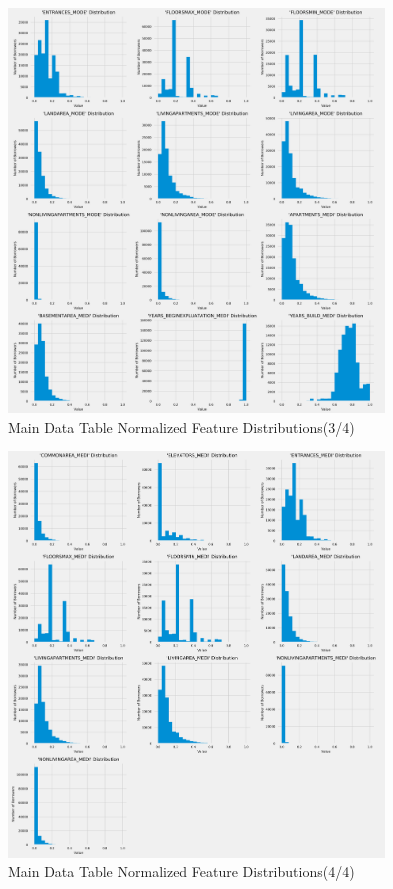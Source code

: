 \documentclass[12pt, letterpaper]{article}
\begin{document}
\begin{appendices}
\pagebreak

\begin{figure}[ht]
\includegraphics[width=0.89\textwidth]{main-data-table-normal-feature-distribs-p3}
\centering
\caption{Main Data Table Normalized Feature Distributions(3/4)}
\end{figure}

\pagebreak

\begin{figure}[ht]
\includegraphics[width=0.89\textwidth]{main-data-table-normal-feature-distribs-p4}
\centering
\caption{Main Data Table Normalized Feature Distributions(4/4)}
\end{figure}


\end{appendices}
\end{document}
